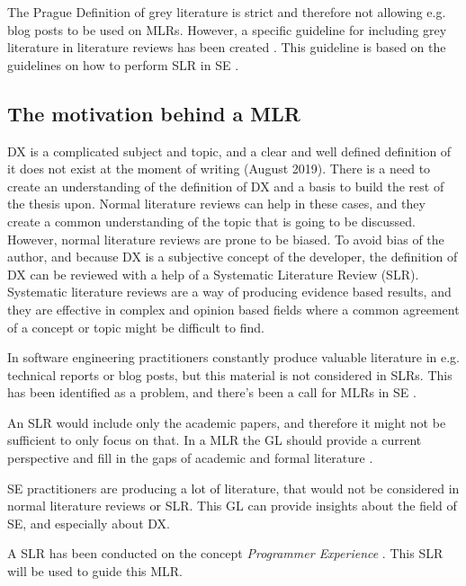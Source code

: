 \documentclass[english, 12pt, a4paper, sci, utf8, a-1b, online]{aaltothesis}
\begin{document}
The Prague Definition of grey literature is strict and therefore not allowing e.g. blog posts to be used on MLRs. However, a specific guideline for including grey literature in literature reviews has been created \citep{guidelines-for-MLR}. This guideline is based on the guidelines on how to perform SLR in SE \citep{guidelines-for-SLR-in-SE}.


\subsection{The motivation behind a MLR}

DX is a complicated subject and topic, and a clear and well defined definition of it does not exist at the moment of writing (August 2019). There is a need to create an understanding of the definition of DX and a basis to build the rest of the thesis upon. Normal literature reviews can help in these cases, and they create a common understanding of the topic that is going to be discussed. However, normal literature reviews are prone to be biased. To avoid bias of the author, and because DX is a subjective concept of the developer, the definition of DX can be reviewed with a help of a Systematic Literature Review (SLR). Systematic literature reviews are a way of producing evidence based results, and they are effective in complex and opinion based fields where a common agreement of a concept or topic might be difficult to find.

In software engineering practitioners constantly produce valuable literature in e.g. technical reports or blog posts, but this material is not considered in SLRs. This has been identified as a problem, and there's been a call for MLRs in SE \citep{the-need-for-MLR}.

An SLR would include only the academic papers, and therefore it might not be sufficient to only focus on that. In a MLR the GL should provide a current perspective and fill in the gaps of academic and formal literature \citep{guidelines-for-MLR}.

SE practitioners are producing a lot of literature, that would not be considered in normal literature reviews or SLR. This GL can provide insights about the field of SE, and especially about DX.

A SLR has been conducted on the concept \textit{Programmer Experience} \citep{programmer-experience}. This SLR will be used to guide this MLR.

\end{document}

